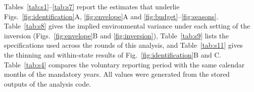 \setcounter{table}{0}
\renewcommand{\thetable}{S\arabic{table}}

Tables~\ref{tab:s1}--\ref{tab:s7} report the estimates that underlie Figs.~\ref{fig:identification}A, \ref{fig:envelope}A and \ref{fig:budget}--\ref{fig:seasons}. Table~\ref{tab:s8} gives the implied environmental variance under each setting of the inversion (Figs.~\ref{fig:envelope}B and \ref{fig:inversion}), Table~\ref{tab:s9} lists the specifications used across the rounds of this analysis, and Table~\ref{tab:s11} gives the thinning and within-state results of Fig.~\ref{fig:identification}B and C. Table~\ref{tab:s4} compares the voluntary reporting period with the same calendar months of the mandatory years. All values were generated from the stored outputs of the analysis code.












